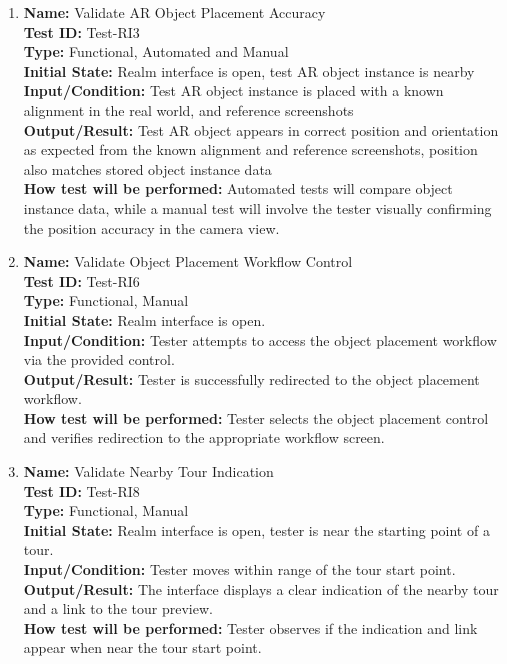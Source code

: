 \documentclass[12pt, titlepage]{article}
\begin{document}
\begin{enumerate}
  \item \textbf{Name:} Validate AR Object Placement Accuracy \label{itm:Test-RI3} \\
        \textbf{Test ID:} Test-RI3 \\
        \textbf{Type:} Functional, Automated and Manual \\
        \textbf{Initial State:} Realm interface is open, test AR object instance is nearby \\
        \textbf{Input/Condition:} Test AR object instance is placed with a known alignment in the real world, and reference screenshots \\
        \textbf{Output/Result:} Test AR object appears in correct position and orientation as expected from the known alignment and reference screenshots, position also matches stored object instance data \\
        \textbf{How test will be performed:} Automated tests will compare object instance data, while a manual test will involve the tester visually confirming the position accuracy in the camera view.

  \item \textbf{Name:} Validate Object Placement Workflow Control \label{itm:Test-RI6} \\
        \textbf{Test ID:} Test-RI6 \\
        \textbf{Type:} Functional, Manual \\
        \textbf{Initial State:} Realm interface is open. \\
        \textbf{Input/Condition:} Tester attempts to access the object placement workflow via the provided control. \\
        \textbf{Output/Result:} Tester is successfully redirected to the object placement workflow. \\
        \textbf{How test will be performed:} Tester selects the object placement control and verifies redirection to the appropriate workflow screen.

  \item \textbf{Name:} Validate Nearby Tour Indication \label{itm:Test-RI8} \\
        \textbf{Test ID:} Test-RI8 \\
        \textbf{Type:} Functional, Manual \\
        \textbf{Initial State:} Realm interface is open, tester is near the starting point of a tour. \\
        \textbf{Input/Condition:} Tester moves within range of the tour start point. \\
        \textbf{Output/Result:} The interface displays a clear indication of the nearby tour and a link to the tour preview. \\
        \textbf{How test will be performed:} Tester observes if the indication and link appear when near the tour start point.


\end{enumerate}
\end{document}

